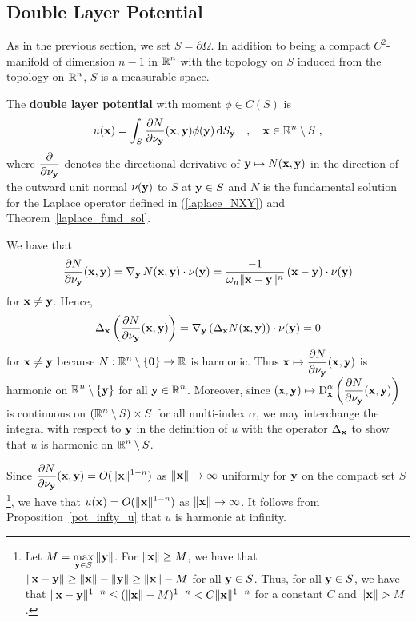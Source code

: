 \subsection{Double Layer Potential}

As in the previous section, we set $S = \partial \Omega$.  In addition
to being a compact $\displaystyle C^2$-manifold of dimension $n-1$ in
$\displaystyle \mathbb{R}^n$ with the topology on $S$ induced from the
topology on $\displaystyle \mathbb{R}^n$, $S$ is a measurable space.

\begin{defn} \label{pot_dblp_def}
The {\bfseries double layer potential} with moment $\phi \in C(S)$ is
\[
u(\mathbf{x}) = \int_S
\frac{\partial{N}}{\partial \mathbf{\nu}_{\mathbf{y}}}(\mathbf{x},\mathbf{y}) \phi(\mathbf{y}) \,\mathrm{d}{S}_{\mathbf{y}}
\quad , \quad \mathbf{x} \in \mathbb{R}^n \setminus S \ ,
\]
where $\displaystyle \frac{\partial{}}{\partial \mathbf{\nu}_{\mathbf{y}}}$ denotes the
directional derivative of $\mathbf{y} \mapsto N(\mathbf{x},\mathbf{y})$ in the
direction of the outward unit normal $\mathbf{\nu}(\mathbf{y})$ to
$S$ at $\mathbf{y} \in S$ and $N$ is the fundamental solution for
the Laplace operator defined in (\ref{laplace_NXY}) and
Theorem~\ref{laplace_fund_sol}.
\end{defn}

We have that
\[
\frac{\partial{N}}{\partial \mathbf{\nu}_{\mathbf{y}}}(\mathbf{x},\mathbf{y}) =
\operatorname{\nabla}_{\mathbf{y}} N(\mathbf{x},\mathbf{y}) \cdot \mathbf{\nu}(\mathbf{y}) =
\frac{-1}{\omega_n \|\mathbf{x}-\mathbf{y}\|^n}\,(\mathbf{x}-\mathbf{y})
\cdot \mathbf{\nu}(\mathbf{y})
\]
for $\mathbf{x} \neq \mathbf{y}$.  Hence,
\[
\Delta_{\mathbf{x}} \left(\frac{\partial{N}}{\partial \mathbf{\nu}_{\mathbf{y}}}(\mathbf{x},\mathbf{y})\right) =
\operatorname{\nabla}_{\mathbf{y}} \left( \Delta_{\mathbf{x}} N(\mathbf{x},\mathbf{y}) \right) \cdot
\mathbf{\nu}(\mathbf{y}) = 0
\]
for $\mathbf{x} \neq \mathbf{y}$ because
$\displaystyle N:\mathbb{R}^n \setminus \{ \mathbf{0} \} \to \mathbb{R}$ is harmonic.
Thus
$\displaystyle \mathbf{x} \mapsto \frac{\partial{N}}{\partial \mathbf{\nu}_{\mathbf{y}}}(\mathbf{x},\mathbf{y})$
is harmonic on $\displaystyle \mathbb{R}^n\setminus \{\mathbf{y}\}$ for all
$\displaystyle \mathbf{y} \in \mathbb{R}^n$.  Moreover, since 
$\displaystyle (\mathbf{x},\mathbf{y}) \mapsto
\operatorname{D}^\alpha_{\mathbf{x}}
\left(\frac{\partial{N}}{\partial \mathbf{\nu}_{\mathbf{y}}}(\mathbf{x},\mathbf{y})\right)$
is continuous on $\displaystyle (\mathbb{R}^n\setminus S)\times S$ for all
multi-index $\alpha$, we may interchange the integral with respect to
$\mathbf{y}$ in the definition of $u$ with the operator
$\Delta_{\mathbf{x}}$ to show that $u$ is harmonic on
$\displaystyle \mathbb{R}^n \setminus S$. 

Since
$\displaystyle 
\frac{\partial{N}}{\partial \mathbf{\nu}_{\mathbf{y}}}(\mathbf{x},\mathbf{y}) = O(\|\mathbf{x}\|^{1-n})$
as $\|\mathbf{x}\| \rightarrow \infty$ uniformly for $\mathbf{y}$ on the
compact set $S$ \footnote{
Let $\displaystyle M = \max_{\mathbf{y} \in S} \|\mathbf{y}\|$.
For $\|\mathbf{x}\| \geq M$, we have that
$\|\mathbf{x}-\mathbf{y}\| \geq \|\mathbf{x}\| - \|\mathbf{y}\| \geq \|\mathbf{x}\| - M$
for all $\mathbf{y} \in S$.  Thus, for all $\mathbf{y} \in S$,
we have that $\|\mathbf{x} - \mathbf{y}\|^{1-n}
\leq (\|\mathbf{x}\| - M)^{1-n} < C \|\mathbf{x}\|^{1-n}$ 
for a constant $C$ and $\|\mathbf{x}\| > M$.}, we have that
$\displaystyle u(\mathbf{x}) = O(\|\mathbf{x}\|^{1-n})$
as $\|\mathbf{x}\| \rightarrow \infty$.
It follows from Proposition~\ref{pot_infty_u} that $u$ is harmonic at
infinity.

